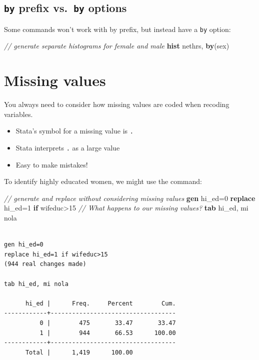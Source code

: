 \documentclass[]{book}
\newenvironment{Shaded}{\begin{snugshade}}{\end{snugshade}}
\newcommand{\CommentTok}[1]{\textcolor[rgb]{0.56,0.35,0.01}{\textit{#1}}}
\newcommand{\FunctionTok}[1]{\textcolor[rgb]{0.00,0.00,0.00}{#1}}
\newcommand{\KeywordTok}[1]{\textcolor[rgb]{0.13,0.29,0.53}{\textbf{#1}}}
\newcommand{\NormalTok}[1]{#1}
\providecommand{\tightlist}{%
  \setlength{\itemsep}{0pt}\setlength{\parskip}{0pt}}
\begin{document}
\hypertarget{by-prefix-vs.-by-options}{%
\subsection{\texorpdfstring{\texttt{by} prefix vs.~\texttt{by} options}{by prefix vs.~by options}}\label{by-prefix-vs.-by-options}}

Some commands won't work with by prefix, but instead have a \texttt{by} option:

\begin{Shaded}
\begin{Highlighting}[]
  \CommentTok{// generate separate histograms for female and male }
  \KeywordTok{hist}\NormalTok{ nethrs, }\KeywordTok{by}\NormalTok{(sex)}
\end{Highlighting}
\end{Shaded}

\hypertarget{missing-values}{%
\section{Missing values}\label{missing-values}}

You always need to consider how missing values are coded when recoding variables.

\begin{itemize}
\tightlist
\item
  Stata's symbol for a missing value is \texttt{.}
\item
  Stata interprets \texttt{.} as a large value
\item
  Easy to make mistakes!
\end{itemize}

To identify highly educated women, we might use the command:

\begin{Shaded}
\begin{Highlighting}[]
  \CommentTok{// generate and replace without considering missing values}
  \KeywordTok{gen}\NormalTok{ hi_ed=0}
  \KeywordTok{replace}\NormalTok{ hi_ed=1 }\KeywordTok{if}\NormalTok{ wifeduc>15}
  \CommentTok{// What happens to our missing values?}
  \KeywordTok{tab}\NormalTok{ hi_ed, }\FunctionTok{mi}\NormalTok{ nola}
\end{Highlighting}
\end{Shaded}

\begin{verbatim}

gen hi_ed=0
replace hi_ed=1 if wifeduc>15
(944 real changes made)

tab hi_ed, mi nola

      hi_ed |      Freq.     Percent        Cum.
------------+-----------------------------------
          0 |        475       33.47       33.47
          1 |        944       66.53      100.00
------------+-----------------------------------
      Total |      1,419      100.00
\end{verbatim}
\end{document}
